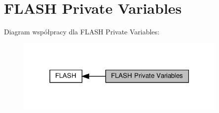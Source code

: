 \hypertarget{group___f_l_a_s_h___private___variables}{}\section{F\+L\+A\+SH Private Variables}
\label{group___f_l_a_s_h___private___variables}
Diagram współpracy dla F\+L\+A\+SH Private Variables\+:\nopagebreak
\begin{figure}[H]
\begin{center}
\leavevmode
\includegraphics[width=291pt]{group___f_l_a_s_h___private___variables}
\end{center}
\end{figure}
